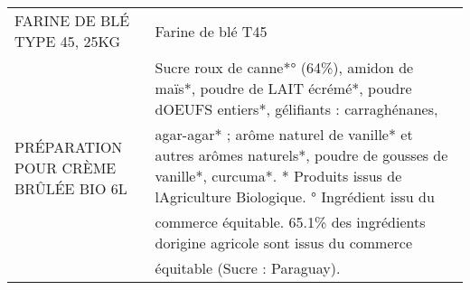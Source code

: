 \begin{longtable}{p{5cm}p{10cm}}
                                                                              FARINE DE BLÉ TYPE 45, 25KG &                                                                                                                                                                                                                                                                                                                                                                                                                                                                                                                                                                                                                                                                                                                                                                                                                                                                                                                                                                                                                        Farine de blé T45 \\
                                                                     PRÉPARATION POUR CRÈME BRÛLÉE BIO 6L &                                                                                                                                                                                                                                                                                                                                                                                                                                                                                                                                                                                                            Sucre roux de canne*° (64\%), amidon de maïs*, poudre de LAIT écrémé*, poudre dOEUFS entiers*, gélifiants : carraghénanes, agar-agar* ; arôme naturel de vanille* et autres arômes naturels*, poudre de gousses de vanille*, curcuma*.  * Produits issus de lAgriculture Biologique.  ° Ingrédient issu du commerce équitable. 65.1\% des ingrédients dorigine agricole sont issus du commerce équitable (Sucre : Paraguay). \\

\end{longtable}
